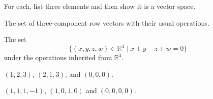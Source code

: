 
\begin{Exercise}[
name={},
title={}, 
difficulty=0,
origin={by Jim Hefferon \cite{JH}}]
For each, list three elements and then show it is a vector space.

\Question The set of three-component row vectors with their usual
        operations.

\Question The set
        \begin{equation*}
          \{(x, y, z, w) \in\mathbb{R}^4\;|\; x+y-z+w=0\}
        \end{equation*}
        under the operations inherited from $\mathbb{R}^4$.
\end{Exercise}

\begin{Answer}
\Question $(1, 2, 3)$, $(2, 1, 3)$, and $(0, 0, 0)$.

\Question $(1, 1, 1, -1)$, $(1, 0, 1, 0)$ and $(0, 0, 0, 0)$.

\end{Answer}
